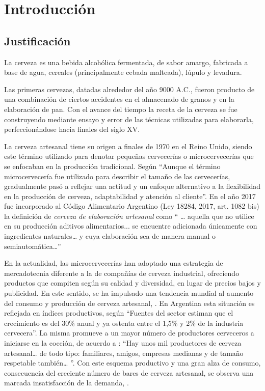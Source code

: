 \chapter{Introducción}
\section{Justificación}
    \par
    La cerveza es una bebida alcohólica fermentada, de sabor amargo, fabricada a base de agua, cereales (principalmente cebada malteada), lúpulo y levadura.
    \par
    Las primeras cervezas, datadas alrededor del año 9000 A.C., fueron producto de una combinación de ciertos accidentes en el almacenado de granos y en la elaboración de pan. Con el avance del tiempo la receta de la cerveza se fue construyendo mediante ensayo y error de las técnicas utilizadas para elaborarla, perfeccionándose hacia finales del siglo XV.
    \par
    La cerveza artesanal tiene su origen a finales de 1970 en el Reino Unido, siendo este término utilizado para denotar pequeñas cervecerías o microcervecerías que se enfocaban en la producción tradicional. Según \cite{Calvillo17} “Aunque el término microcervecería fue utilizado para describir el tamaño de las cervecerías, gradualmente pasó a reflejar una actitud y un enfoque alternativo a la flexibilidad en la producción de cerveza, adaptabilidad y atención al cliente”. En el año 2017 fue incorporado al Código Alimentario Argentino (Ley 18284, 2017, art. 1082 bis) la definición de \textit{cerveza de elaboración artesanal} como “ … aquella que no utilice en su producción aditivos alimentarios... se encuentre adicionada únicamente con ingredientes naturales… y cuya elaboración sea de manera manual o semiautomática…”
    \par
    En la actualidad, las microcervecerías han adoptado una estrategia de mercadotecnia diferente a la de compañías de cerveza industrial, ofreciendo productos que compiten según su calidad y diversidad, en lugar de precios bajos y publicidad. En este sentido, se ha  impulsado una tendencia mundial al aumento del consumo y producción de cerveza artesanal, \cite{Calvillo17}. En Argentina esta situación es reflejada en índices productivos, según \cite{Cuculiansky17} “Fuentes del sector estiman que el crecimiento es del 30\% anual y ya ostenta entre el 1,5\% y 2\% de la industria cervecera”. La misma promueve a un mayor número de productores cerveceros a iniciarse en la cocción, de acuerdo a \cite{Aizen17}: “Hay unos mil productores de cerveza artesanal… de todo tipo: familiares, amigos, empresas medianas y de tamaño respetable también… ”. Con este esquema productivo y una gran alza de consumo, consecuencia del creciente número de bares de cerveza artesanal, se observa una marcada insatisfacción de la demanda, \cite{Rios16}.
